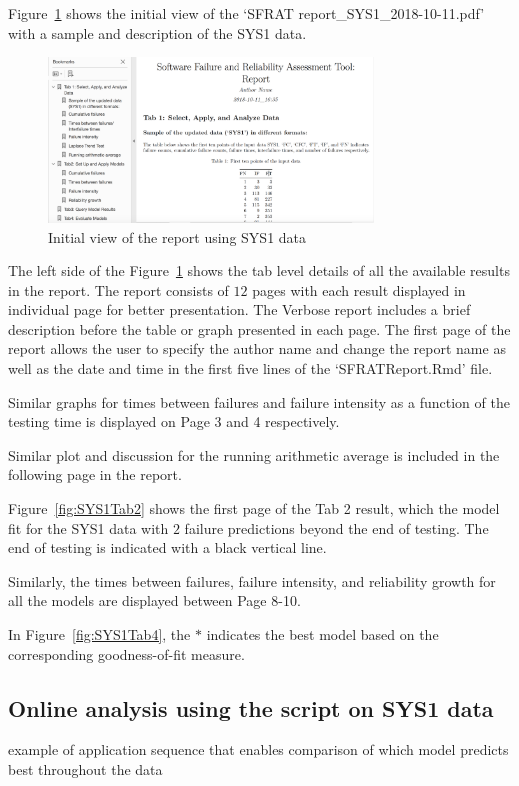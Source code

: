 \documentclass[conference]{IEEEtran}
\begin{document}
Figure~\ref{fig:SYS1Report} shows the initial view of the `SFRAT report\_SYS1\_2018-10-11.pdf' with a sample and description of the SYS1 data.
\begin{figure}[!ht]
\centering
\includegraphics[width=3.4in]{Figures/SYS1Report}
\caption{Initial view of the report using SYS1 data}
\label{fig:SYS1Report}
\end{figure}

\noindent The left side of the Figure~\ref{fig:SYS1Report} shows the tab level details of all the available results in the report. The report consists of $12$ pages with each result displayed in individual page for better presentation. The Verbose report includes a brief description before the table or graph presented in each page. The first page of the report allows the user to specify the author name and change the report name as well as the date and time in the first five lines of the `SFRATReport.Rmd' file.

\noindent Similar graphs for times between failures and failure intensity as a function of the testing time is displayed on Page 3 and 4 respectively.

\noindent Similar plot and discussion for the running arithmetic average is included in the following page in the report.


Figure~\ref{fig:SYS1Tab2} shows the first page of the Tab 2 result, which the model fit for the SYS1 data with $2$ failure predictions beyond the end of testing. The end of testing is indicated with a black vertical line.

\noindent Similarly, the times between failures, failure intensity, and reliability growth for all the models are displayed between Page 8-10.


\noindent In Figure~\ref{fig:SYS1Tab4}, the $*$ indicates the best model based on the corresponding goodness-of-fit measure.


\subsection{Online analysis using the script on SYS1 data}\label{sec:Ex:ScriptOnline}
example of application sequence that enables comparison of which model predicts best throughout the data
\end{document}
